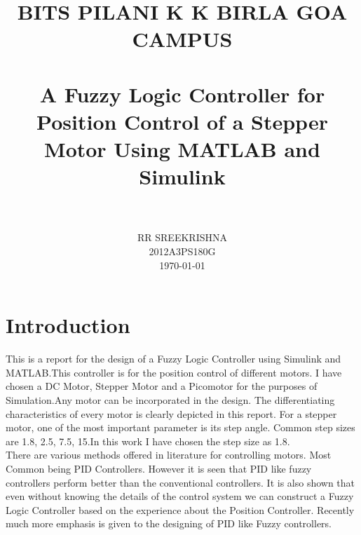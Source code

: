 \documentclass[paper=a4, fontsize=11pt]{scrartcl}
\title{
		\usefont{OT1}{bch}{b}{n}
		\normalfont \normalsize \textsc{BITS PILANI K K BIRLA GOA CAMPUS} \\ [25pt]
		\horrule{0.5pt} \\[0.4cm]
		\huge A Fuzzy Logic Controller for Position Control of a Stepper Motor Using MATLAB and Simulink \\
		\horrule{2pt} \\[0.5cm]
}
\author{
		\normalfont 								\normalsize
        RR SREEKRISHNA\\[-3pt]
        2012A3PS180G\\[-3pt]		\normalsize
        \today
}
\date{}
\numberwithin{equation}{section}		%
\numberwithin{figure}{section}			%
\numberwithin{table}{section}				%
\begin{document}
\maketitle
\indent \section{Introduction}
This is a report for the design of a Fuzzy Logic Controller using Simulink and MATLAB.This controller is for the position control of different motors. I have chosen a DC Motor, Stepper Motor and a Picomotor for the purposes of Simulation.Any motor can be incorporated in the design. The differentiating characteristics of every motor is clearly depicted in this report. For a stepper motor, one of the most important parameter is its step angle. Common step sizes are 1.8\degree, 2.5\degree, 7.5\degree, 15\degree.In this work I have chosen the step size as 1.8\degree.\\
\indent There are various methods offered in literature for controlling motors. Most Common being PID Controllers. However it is seen that PID like fuzzy controllers perform better than the conventional controllers. It is also shown that even without knowing the  details of the control system we can construct a Fuzzy Logic Controller based on the experience about the Position Controller. Recently much more emphasis is given to the designing of PID like Fuzzy controllers. \\
\end{document}
